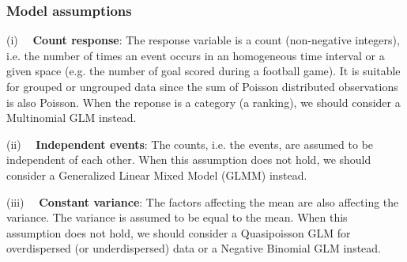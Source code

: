 \documentclass[border=5mm, convert, usenames, dvipsnames,beamer]{standalone}
\begin{document}





\begin{frame}[ fragile]{}
\frametitle{Model assumptions}

\footnotesize
\vspace{30}
\noindent
(i) \ \ \textbf{Count response}: The response variable is a count (non-negative integers), i.e. the number of times an event occurs in an homogeneous time interval or a given space (e.g. the number of goal scored during a football game). It is suitable for grouped or ungrouped data since the sum of Poisson distributed observations is also Poisson. {\color{purple} When the reponse is a category (a ranking), we should consider a Multinomial GLM instead.}

\vspace{15}
\noindent
(ii) \ \ \textbf{Independent events}: The counts, i.e. the events, are assumed to be independent of each other. {\color{purple} When this assumption does not hold, we should consider a Generalized Linear Mixed Model (GLMM) instead.}


\vspace{15}
\noindent
(iii) \ \ \textbf{Constant variance}: The factors affecting the mean are also affecting the variance. The variance is assumed to be equal to the mean. {\color{purple}When this assumption does not hold, we should consider a Quasipoisson GLM for overdispersed (or underdispersed) data or a Negative Binomial GLM instead.}


\end{frame}
\end{document}
